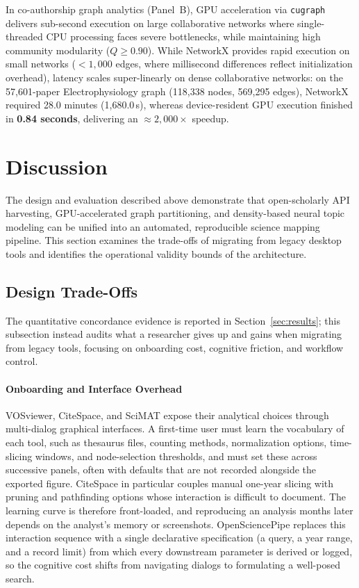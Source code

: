 \documentclass[preprint,12pt]{elsarticle}
\begin{document}
In co-authorship graph analytics (Panel~B), GPU acceleration via \texttt{cugraph} delivers sub-second execution on large collaborative networks where single-threaded CPU processing faces severe bottlenecks, while maintaining high community modularity ($Q \ge 0.90$). While NetworkX provides rapid execution on small networks ($< 1{,}000$ edges, where millisecond differences reflect initialization overhead), latency scales super-linearly on dense collaborative networks: on the 57,601-paper Electrophysiology graph (118,338 nodes, 569,295 edges), NetworkX required 28.0 minutes (1,680.0\,s), whereas device-resident GPU execution finished in \textbf{0.84 seconds}, delivering an $\approx 2{,}000\times$ speedup.

\section{Discussion}
\label{sec:discussion}
The design and evaluation described above demonstrate that open-scholarly API harvesting, GPU-accelerated graph partitioning, and density-based neural topic modeling can be unified into an automated, reproducible science mapping pipeline. This section examines the trade-offs of migrating from legacy desktop tools and identifies the operational validity bounds of the architecture.

\subsection{Design Trade-Offs}
The quantitative concordance evidence is reported in Section~\ref{sec:results}; this subsection instead audits what a researcher gives up and gains when migrating from legacy tools, focusing on onboarding cost, cognitive friction, and workflow control.

\paragraph{Onboarding and Interface Overhead}
VOSviewer, CiteSpace, and SciMAT expose their analytical choices through multi-dialog graphical interfaces. A first-time user must learn the vocabulary of each tool, such as thesaurus files, counting methods, normalization options, time-slicing windows, and node-selection thresholds, and must set these across successive panels, often with defaults that are not recorded alongside the exported figure. CiteSpace in particular couples manual one-year slicing with pruning and pathfinding options whose interaction is difficult to document. The learning curve is therefore front-loaded, and reproducing an analysis months later depends on the analyst's memory or screenshots. OpenSciencePipe replaces this interaction sequence with a single declarative specification (a query, a year range, and a record limit) from which every downstream parameter is derived or logged, so the cognitive cost shifts from navigating dialogs to formulating a well-posed search.
\end{document}
